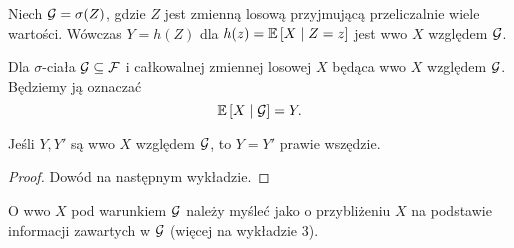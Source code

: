 \begin{example}
  \item Niech $\mathcal{G}=\sigma(Z)$, gdzie $Z$ jest zmienną losową przyjmującą przeliczalnie wiele wartości. Wówczas $Y=h(Z)$ dla $h(z)=\expected{X}{Z=z}$ jest wwo $X$ względem $\mathcal{G}$.
\end{example}

\begin{theorem}\label{poprawnosc wwo}
Dla $\sigma$-ciała $\mathcal{G}\subseteq\mathcal{F}$ i całkowalnej zmiennej losowej $X$  będąca wwo $X$ względem $\mathcal{G}$. Będziemy ją oznaczać
$$\expected{X}{\set{G}}=Y.$$

    Jeśli $Y, Y'$ są wwo $X$ względem $\mathcal{G}$, to $Y=Y'$ prawie wszędzie.
\end{theorem}

\begin{proof}
  Dowód na następnym wykładzie.
\end{proof}

\begin{uwaga}
  O wwo $X$ pod warunkiem $\mathcal{G}$ należy myśleć jako o przybliżeniu $X$ na podstawie informacji zawartych w $\mathcal{G}$ (więcej na wykładzie 3).
\end{uwaga}

